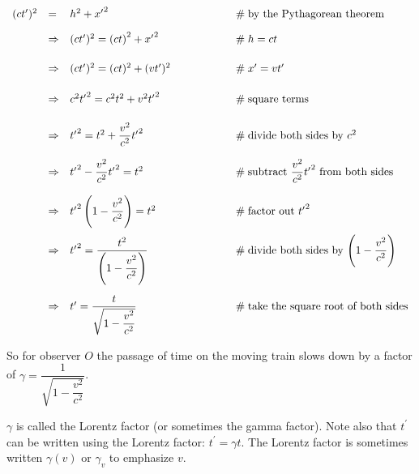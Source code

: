 \documentclass{article}
\theoremstyle{definition}
\begin{document}
\bigskip
\begin{equation*}
 \begin{array}{llll}
     (c t^{\prime})^2
     &=& h^2 + {x^{\prime}}^2 					
     		&\hspace{5.00em} \mathrel{\#} \text{by the Pythagorean theorem} \\
[10pt]
     &\Rightarrow& (c t^{\prime})^2 = {(ct)}^2 + {x^{\prime}}^2 					
     		&\hspace{5.00em} \mathrel{\#} h = c t \\
[15pt]
	&\Rightarrow& (c t^{\prime})^2 = (ct)^2 + (v t^{\prime})^2
			&\hspace{5.00em} \mathrel{\#} x^{\prime} = v t^{\prime} \\
[15pt]
	&\Rightarrow& c^2 {t^{\prime}}^2 = c^2t^2 + v^2 {t^{\prime}}^2
			&\hspace{5.00em} \mathrel{\#}  \text{square terms} \\
[15pt]
	&\Rightarrow& {t^{\prime}}^2 = t^2 + \dfrac{v^2}{c^2} {t^{\prime}}^2
			&\hspace{5.00em} \mathrel{\#}  \text{divide both sides by $c^2$} \\
[15pt]
	&\Rightarrow& {t^{\prime}}^2 - \dfrac{v^2}{c^2} {t^{\prime}}^2 = t^2 
			&\hspace{5.00em} \mathrel{\#}  \text{subtract $\dfrac{v^2}{c^2} 
			{t^{\prime}}^2$ from both sides} \\
[15pt]
	&\Rightarrow& {t^{\prime}}^2 \left (1 - \dfrac{v^2}{c^2} \right) = t^2 
			&\hspace{5.00em} \mathrel{\#} \text{factor out ${t^{\prime}}^2$} \\
[15pt]	
	&\Rightarrow& {t^{\prime}}^2 = \dfrac{t^2}{\left (1 - \dfrac{v^2}{c^2} \right)}
			&\hspace{5.00em} \mathrel{\#}  \text{divide both sides by $\left 
			(1 - \dfrac{v^2}{c^2}\right )$} \\
[35pt]
	&\Rightarrow& t^{\prime} = \dfrac{t}{\sqrt{1 - \dfrac{v^2}{c^2}}}
			&\hspace{5.00em} \mathrel{\#}  \text{take the square root of both sides}
  \end{array}
\end{equation*}


\bigskip
\noindent
So for observer $O$ the passage of time on the moving train slows
down by a factor of $\gamma = \dfrac{1}{\sqrt{1-\dfrac{v^2}{c^2}}}$.

\bigskip
\noindent
$\gamma$ is called the Lorentz factor (or sometimes the gamma
factor). Note also that $t^{\prime}$ can be written using the
Lorentz factor: $t^{\prime} = \gamma t$. The Lorentz factor is
sometimes written $\gamma(v)$ or $\gamma_{v}$ to emphasize $v$.
%
%
%
\end{document}
